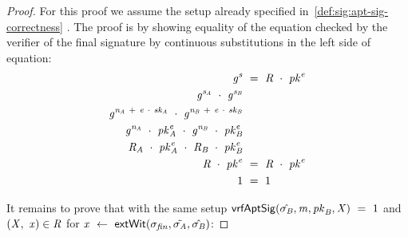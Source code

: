\begin{proof}
    \label{prf:apt-schnorr-pre-sig-corr}
    For this proof we assume the setup already specified in~\cref{def:sig:apt-sig-correctness} .
    The proof is by showing equality of the equation checked by the verifier of the final signature by continuous substitutions in the left side of equation:
    \begin{align}
        \mathit{g}^{\mathit{s}} &~=~ \mathit{R} ~\cdot~ \mathit{pk}^{\mathit{e}} \\
        \mathit{g}^{\mathit{s}_{\mathit{A}}} ~\cdot~ \mathit{g}^{\mathit{s}_{\mathit{B}}} & \\
        \mathit{g}^{\mathit{\mathit{n}_{\mathit{A}}} ~+~ \mathit{e} ~\cdot~ \mathit{sk}_{\mathit{A}}} ~\cdot~ \mathit{g}^{\mathit{\mathit{n}_{\mathit{B}}} ~+~ \mathit{e} ~\cdot~ \mathit{sk}_{\mathit{B}}} & \\
        \mathit{g}^{\mathit{\mathit{n}_{\mathit{A}}}} ~\cdot~ \mathit{pk}_{\mathit{A}}^{\mathit{e}} ~\cdot~ \mathit{g}^{\mathit{\mathit{n}_{\mathit{B}}}} ~\cdot~ \mathit{pk}_{\mathit{B}}^{\mathit{e}} & \\
        \mathit{R}_{\mathit{A}} ~\cdot~ \mathit{pk}_{\mathit{A}}^{\mathit{e}} ~\cdot~ \mathit{R}_{\mathit{B}} ~\cdot~ \mathit{pk}_{\mathit{B}}^{\mathit{e}} & \\
        \mathit{R} ~\cdot~ \mathit{pk}^{\mathit{e}} & ~=~ \mathit{R} ~\cdot~ \mathit{pk}^{\mathit{e}} \\
        1 & ~=~ 1
    \end{align}

    It remains to prove that with the same setup $\mathsf{vrfAptSig}(\hat{\sigma_{\mathit{B}}},\mathit{m},\mathit{pk}_{\mathit{B}},\mathit{X}) ~=~ 1$ and
    $(\mathit{X} ,~ \mathit{x}) \in \mathit{R}$ for $\mathit{x} ~\leftarrow~ \mathsf{extWit}(\sigma_{\mathit{fin}}, \tilde{\sigma_{\mathit{A}}}, \hat{\sigma_{\mathit{B}}})$:


\end{proof}
